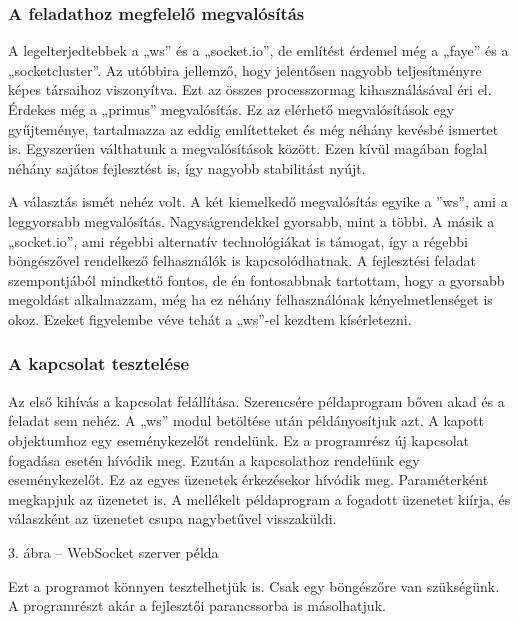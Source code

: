 \documentclass[]{article}
\begin{document}
\hypertarget{a-feladathoz-megfelelux151-megvaluxf3suxedtuxe1s}{%
\subsubsection{A feladathoz megfelelő
megvalósítás}\label{a-feladathoz-megfelelux151-megvaluxf3suxedtuxe1s}}

A legelterjedtebbek a „ws'' és a „socket.io'', de említést érdemel még a
„faye'' és a „socketcluster''. Az utóbbira jellemző, hogy jelentősen
nagyobb teljesítményre képes társaihoz viszonyítva. Ezt az összes
processzormag kihasználásával éri el. Érdekes még a „primus''
megvalósítás. Ez az elérhető megvalósítások egy gyűjteménye, tartalmazza
az eddig említetteket és még néhány kevésbé ismertet is. Egyszerűen
válthatunk a megvalósítások között. Ezen kívül magában foglal néhány
sajátos fejlesztést is, így nagyobb stabilitást nyújt.

A választás ismét nehéz volt. A két kiemelkedő megvalósítás egyike a
''ws'', ami a leggyorsabb megvalósítás. Nagyságrendekkel gyorsabb, mint
a többi. A másik a „socket.io'', ami régebbi alternatív technológiákat
is támogat, így a régebbi böngészővel rendelkező felhasználók is
kapcsolódhatnak. A fejlesztési feladat szempontjából mindkettő fontos,
de én fontosabbnak tartottam, hogy a gyorsabb megoldást alkalmazzam, még
ha ez néhány felhasználónak kényelmetlenséget is okoz. Ezeket figyelembe
véve tehát a „ws''-el kezdtem kísérletezni.

\hypertarget{a-kapcsolat-teszteluxe9se}{%
\subsubsection{A kapcsolat tesztelése}\label{a-kapcsolat-teszteluxe9se}}

Az első kihívás a kapcsolat felállítása. Szerencsére példaprogram bőven
akad és a feladat sem nehéz. A „ws'' modul betöltése után példányosítjuk
azt. A kapott objektumhoz egy eseménykezelőt rendelünk. Ez a programrész
új kapcsolat fogadása esetén hívódik meg. Ezután a kapcsolathoz
rendelünk egy eseménykezelőt. Ez az egyes üzenetek érkezésekor hívódik
meg. Paraméterként megkapjuk az üzenetet is. A mellékelt példaprogram a
fogadott üzenetet kiírja, és válaszként az üzenetet csupa nagybetűvel
visszaküldi.

3. ábra -- WebSocket szerver példa

Ezt a programot könnyen tesztelhetjük is. Csak egy böngészőre van
szükségünk. A programrészt akár a fejlesztői parancssorba is
másolhatjuk.
\end{document}
